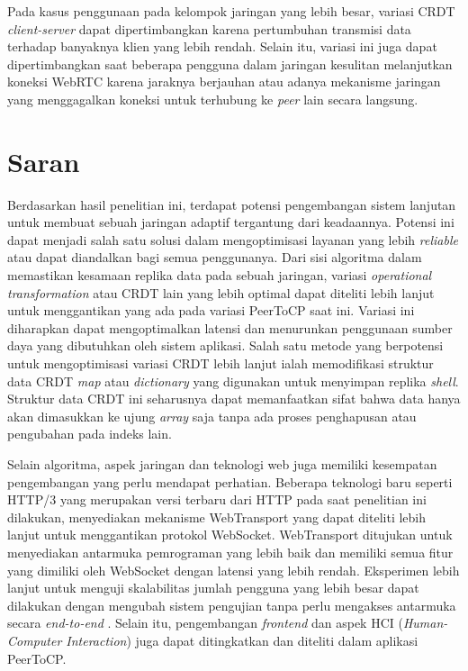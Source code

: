 Pada kasus penggunaan pada kelompok jaringan yang lebih besar, variasi CRDT \textit{client-server} dapat dipertimbangkan karena pertumbuhan transmisi data terhadap banyaknya klien yang lebih rendah. Selain itu, variasi ini juga dapat dipertimbangkan saat beberapa pengguna dalam jaringan kesulitan melanjutkan koneksi WebRTC karena jaraknya berjauhan atau adanya mekanisme jaringan yang menggagalkan koneksi untuk terhubung ke \textit{peer} lain secara langsung.



\section{Saran}
\label{sec:saran}

Berdasarkan hasil penelitian ini, terdapat potensi pengembangan sistem lanjutan untuk membuat sebuah jaringan adaptif tergantung dari keadaannya. Potensi ini dapat menjadi salah satu solusi dalam mengoptimisasi layanan yang lebih \textit{reliable} atau dapat diandalkan bagi semua penggunanya. Dari sisi algoritma dalam memastikan kesamaan replika data pada sebuah jaringan, variasi \textit{operational transformation} atau CRDT lain yang lebih optimal dapat diteliti lebih lanjut untuk menggantikan yang ada pada variasi PeerToCP saat ini. Variasi ini diharapkan dapat mengoptimalkan latensi dan menurunkan penggunaan sumber daya yang dibutuhkan oleh sistem aplikasi. Salah satu metode yang berpotensi untuk mengoptimisasi variasi CRDT lebih lanjut ialah memodifikasi struktur data CRDT \textit{map} atau \textit{dictionary} yang digunakan untuk menyimpan replika \textit{shell}. Struktur data CRDT ini seharusnya dapat memanfaatkan sifat bahwa data hanya akan dimasukkan ke ujung \textit{array} saja tanpa ada proses penghapusan atau pengubahan pada indeks lain.

Selain algoritma, aspek jaringan dan teknologi web juga memiliki kesempatan pengembangan yang perlu mendapat perhatian. Beberapa teknologi baru seperti HTTP/3 yang merupakan versi terbaru dari HTTP pada saat penelitian ini dilakukan, menyediakan mekanisme WebTransport yang dapat diteliti lebih lanjut untuk menggantikan protokol WebSocket. WebTransport ditujukan untuk menyediakan antarmuka pemrograman yang lebih baik dan memiliki semua fitur yang dimiliki oleh WebSocket dengan latensi yang lebih rendah. Eksperimen lebih lanjut untuk menguji skalabilitas jumlah pengguna yang lebih besar dapat dilakukan dengan mengubah sistem pengujian tanpa perlu mengakses antarmuka secara \textit{end-to-end} . Selain itu, pengembangan \textit{frontend} dan aspek HCI (\textit{Human-Computer Interaction}) juga dapat ditingkatkan dan diteliti dalam aplikasi PeerToCP.

